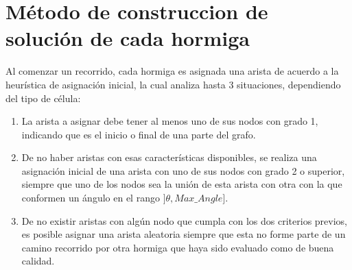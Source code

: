 \section{M\'etodo de construccion de soluci\'on de cada hormiga}
\label{subsubsec:antTourInit}
Al comenzar un recorrido, cada hormiga es asignada una arista de acuerdo a la heur\'istica de asignaci\'on inicial, la cual analiza hasta 3 situaciones, dependiendo del tipo de c\'elula:
\begin{enumerate}
\item La arista a asignar debe tener al menos uno de sus nodos con grado 1, indicando que es el inicio o final de una parte del grafo.

\item De no haber aristas con esas caracter\'isticas disponibles, se realiza una asignaci\'on inicial de una arista con uno de sus nodos con grado 2 o superior, siempre que uno de los nodos sea la uni\'on de esta arista con otra con la que conformen un \'angulo en el rango $]\theta, Max\_Angle]$. 

\item De no existir aristas con alg\'un nodo que cumpla con los dos criterios previos, es posible asignar una arista aleatoria siempre que esta no forme parte de un camino recorrido por otra hormiga que haya sido evaluado como de buena calidad.
\end{enumerate}



